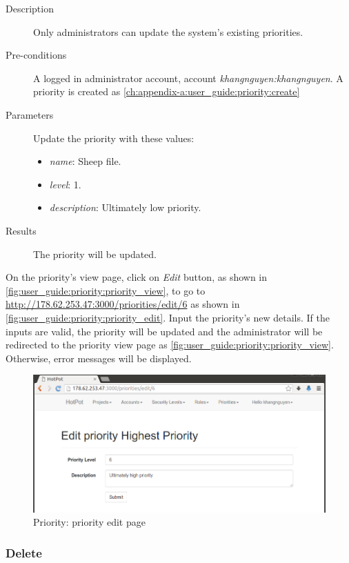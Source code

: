 \begin{description}
\item[Description] Only administrators can update the system's existing priorities.
\item[Pre-conditions] A logged in administrator account, \eg account \emph{khangnguyen:khangnguyen}.
A priority is created as \autoref{ch:appendix-a:user_guide:priority:create}
\item[Parameters] Update the priority with these values:
\begin{itemize}
\item \emph{name}: Sheep file.
\item \emph{level}: 1.
\item \emph{description}: Ultimately low priority.
\end{itemize}
\item[Results] The priority will be updated.
\end{description}

On the priority's view page, click on \emph{Edit} button, as shown in \autoref{fig:user_guide:priority:priority_view}, 
to go to \href{http://178.62.253.47:3000/priorities/edit/6}{http://178.62.253.47:3000/priorities/edit/6} as shown in \autoref{fig:user_guide:priority:priority_edit}.
Input the priority's new details.
If the inputs are valid, the priority will be updated and the administrator will be redirected to the priority view page as \autoref{fig:user_guide:priority:priority_view}.
Otherwise, error messages will be displayed.

\begin{figure}[bth]
\myfloatalign
\includegraphics[width=1.0\linewidth]{gfx/chapter_5/priority/priority_edit}
\caption[Priority: priority edit page]{Priority: priority edit page}
\label{fig:user_guide:priority:priority_edit}
\end{figure}

\subsubsection{Delete}
\label{ch:appendix-a:user_guide:priority:delete}

